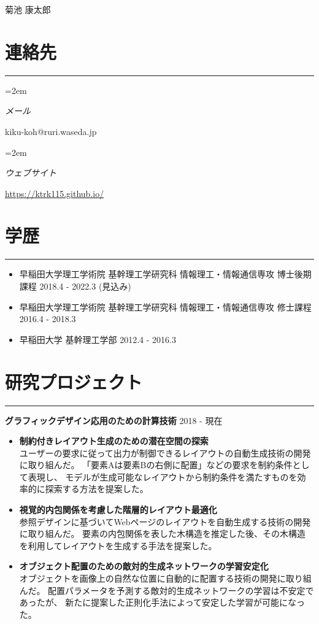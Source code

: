 \documentclass[a4paper,11pt]{ltjsarticle}
\newcommand{\sectrule}{
    \vspace*{-1.1\baselineskip}
    \noindent\rule{\linewidth}{3pt}}
\newlength{\spacebox}
\newcommand{\sepspace}{\vspace*{1em}}        %
\newcommand{\MyName}[1]{ %
  \begin{center}
    {\huge #1}
  \end{center}
}
\newcommand{\MySlogan}[1]{ %
        \large \usefont{OT1}{phv}{m}{n}\hfill \textit{#1}
        \par \normalsize \normalfont}
\newcommand{\NewPart}[1]{\section*{\uppercase{#1}}\sectrule}
\newcommand{\PersonalEntry}[2]{
        \noindent\hangindent=2em\hangafter=0 %
        \parbox{\spacebox}{        %
        \textit{#1}}               %
        \hspace{1.5em} #2 \par}    %
\begin{document}

\MyName{菊池 康太郎}


\NewPart{連絡先}{}

\PersonalEntry{メール}{kiku-koh@ruri.waseda.jp}
\PersonalEntry{ウェブサイト}{\url{https://ktrk115.github.io/}}

\NewPart{学歴}{}
\begin{itemize}[leftmargin=2em,topsep=0.5em,itemsep=0em]
    \item[] {\small 早稲田大学理工学術院 基幹理工学研究科 情報理工・情報通信専攻 博士後期課程} \hfill 2018.4 - 2022.3 (見込み)
    \item[] {\small 早稲田大学理工学術院 基幹理工学研究科 情報理工・情報通信専攻 修士課程} \hfill 2016.4 - 2018.3
    \item[] {\small 早稲田大学 基幹理工学部} \hfill 2012.4 - 2016.3
\end{itemize}

\NewPart{研究プロジェクト}{}

\noindent \textbf{\large グラフィックデザイン応用のための計算技術} \hfill 2018 - 現在
\begin{itemize}[leftmargin=2em,topsep=0.5em,itemsep=0em]
    \item \textbf{制約付きレイアウト生成のための潜在空間の探索} \\
    ユーザーの要求に従って出力が制御できるレイアウトの自動生成技術の開発に取り組んだ。
    「要素Aは要素Bの右側に配置」などの要求を制約条件として表現し、
    モデルが生成可能なレイアウトから制約条件を満たすものを効率的に探索する方法を提案した。
    \item \textbf{視覚的内包関係を考慮した階層的レイアウト最適化} \\
    参照デザインに基づいてWebページのレイアウトを自動生成する技術の開発に取り組んだ。
    要素の内包関係を表した木構造を推定した後、その木構造を利用してレイアウトを生成する手法を提案した。
    \item \textbf{オブジェクト配置のための敵対的生成ネットワークの学習安定化} \\
    オブジェクトを画像上の自然な位置に自動的に配置する技術の開発に取り組んだ。
    配置パラメータを予測する敵対的生成ネットワークの学習は不安定であったが、
    新たに提案した正則化手法によって安定した学習が可能になった。
\end{itemize}
\end{document}
